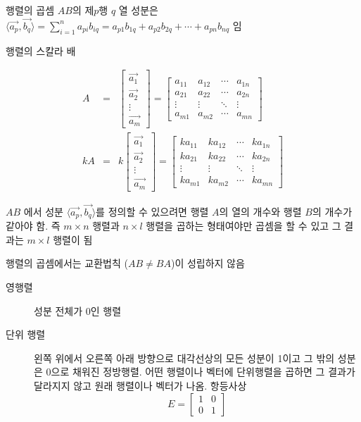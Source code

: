 \documentclass[10pt,t]{beamer}
\begin{document}
\begin{frame}{행렬의 곱셈}
$AB$의 제$p$행 $q$ 열 성분은 $\langle \vec{a_p}, \vec{b_q} \rangle = \sum_{i=1} ^n a_{pi} b_{iq} = a_{p1}b_{1q} + a_{p2}b_{2q} + \cdots +  a_{pn}b_{nq}$ 임

\pagebreak
행렬의 스칼라 배

\begin{eqnarray*}
    A &=& \begin{bmatrix}
        \vec{a_1}\\
        \vec{a_2}\\
        \vdots \\
        \vec{a_m}
    \end{bmatrix} = \begin{bmatrix}
        a_{11} & a_{12} & \cdots & a_{1n} \\
        a_{21} & a_{22} & \cdots & a_{2n} \\
         \vdots & \vdots & \ddots & \vdots \\
        a_{m1} & a_{m2} & \cdots & a_{mn} 
    \end{bmatrix} \\
    kA &=& k\begin{bmatrix}
        \vec{a_1}\\
        \vec{a_2}\\
        \vdots \\
        \vec{a_m}
    \end{bmatrix} = \begin{bmatrix}
        ka_{11} & ka_{12} & \cdots & ka_{1n} \\
        ka_{21} & ka_{22} & \cdots & ka_{2n} \\
         \vdots & \vdots & \ddots & \vdots \\
        ka_{m1} & ka_{m2} & \cdots & ka_{mn} 
    \end{bmatrix}
\end{eqnarray*}

\pagebreak
$AB$ 에서 성분 $\langle \vec{a_p}, \vec{b_q} \rangle$를 정의할 수 있으려면 행렬 $A$의 열의 개수와 행렬 $B$의 개수가 같아야 함. 즉 $m\times n$ 행렬과 $n \times l$ 행렬을 곱하는 형태여야만 곱셈을 할 수 있고 그 결과는 $m \times l$ 행렬이 됨

행렬의 곱셈에서는 교환법칙 ($AB \neq BA$)이 성립하지 않음

\begin{description}
    \item[영행렬] 성분 전체가 $0$인 행렬
    \item[단위 행렬] 왼쪽 위에서 오른쪽 아래 방향으로 대각선상의 모든 성분이 1이고 그 밖의 성분은 0으로 채워진 정방행렬. 어떤 행렬이나 벡터에 단위행렬을 곱하면 그 결과가 달라지지 않고 원래 행렬이나 벡터가 나옴. 항등사상\\
    \[E = \begin{bmatrix}
        1 & 0 \\
        0 & 1
    \end{bmatrix}\]  
\end{description}

\end{frame}
\end{document}
